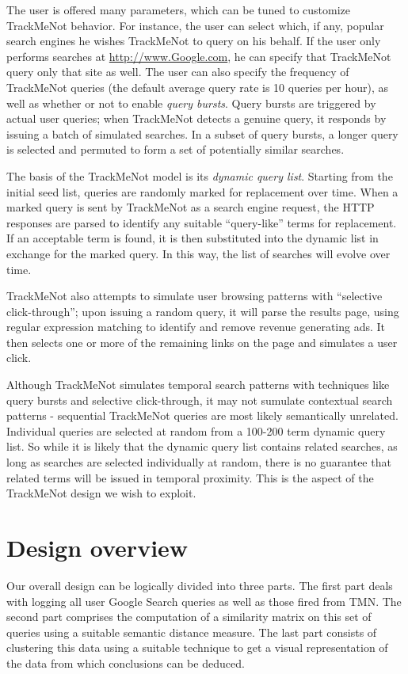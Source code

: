 \documentclass[11pt]{article}
\begin{document}
\begin{multicols}{2}
The user is offered many parameters, which can be tuned to customize
TrackMeNot behavior. For instance, the user can select which, if any,
popular search engines he wishes TrackMeNot to query on his behalf. If
the user only performs searches at \url{http://www.Google.com}, he can
specify that TrackMeNot query only  that site as well. The user can
also specify the frequency of TrackMeNot queries (the default average
query rate is 10 queries per hour), as well as whether or not to enable {\it query
bursts}. Query bursts are triggered by actual user queries; when
TrackMeNot detects a genuine query, it responds by issuing a batch of
simulated searches. In a subset of query bursts, a longer query is
selected and permuted to form a set of potentially similar searches.

The basis of the TrackMeNot model is its {\it dynamic query
  list}. Starting from the initial seed list, queries are randomly
marked for replacement over time. When a marked query is sent by TrackMeNot as a
search engine request, the HTTP responses are parsed to identify any
suitable ``query-like'' terms for replacement. If an acceptable term
is found, it is then substituted into the dynamic list in exchange for
the marked query. In this way, the list of searches will evolve over
time.

TrackMeNot also attempts to simulate user browsing patterns with
``selective click-through''; upon issuing a random query,
it will parse the results page, using regular expression matching to
identify and remove revenue generating ads. It then selects one or
more of the remaining links on the page and simulates a user click.

Although TrackMeNot simulates temporal search patterns with techniques
like query bursts and selective click-through, it may not sumulate
contextual search patterns - sequential TrackMeNot queries are most
likely semantically unrelated. Individual queries are selected at
random from a 100-200 term dynamic query list. So while it is likely
that the dynamic query list contains related searches, as long as
searches are selected individually at random, there is no guarantee
that related terms will be issued in temporal proximity. This is the
aspect of the TrackMeNot design we wish to exploit.

\section{Design overview}
\label{sec:design}
Our overall design can be logically divided into three parts. The
first part deals with logging all user Google Search queries as well
as those fired from TMN. The second part comprises the computation of
a similarity matrix on this set of queries using a suitable semantic
distance measure. The last part consists of clustering this data using
a suitable technique to get a visual representation of the data from
which conclusions can be deduced.


\end{multicols}
\end{document}
